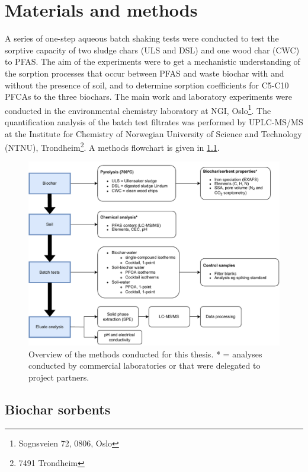 \chapter{Materials and methods}\label{chap:MatlsMethds}
A series of one-step aqueous batch shaking tests were conducted to test the sorptive capacity of two sludge chars (ULS and DSL) and one wood char (CWC) to PFAS. The aim of the experiments were to get a mechanistic understanding of the sorption processes that occur between PFAS and waste biochar with and without the presence of soil, and to determine sorption coefficients for C5-C10 PFCAs to the three biochars. The main work and laboratory experiments were conducted in the environmental chemistry laboratory at NGI, Oslo\footnote{Sognsveien 72, 0806, Oslo}. The quantification analysis of the batch test filtrates was performed by UPLC-MS/MS at the Institute for Chemistry of Norwegian University of Science and Technology (NTNU), Trondheim\footnote{7491 Trondheim}. A methods flowchart is given in \cref{fig:methodoverview}. 

\begin{figure}
    \centering
    \includegraphics[width=\textwidth]{Bilder/Flowcharts/Batch tests-General_overview_methods.pdf}
    \caption{Overview of the methods conducted for this thesis. * = analyses conducted by commercial laboratories or that were delegated to project partners.}
    \label{fig:methodoverview}
\end{figure}

\section{Biochar sorbents}

